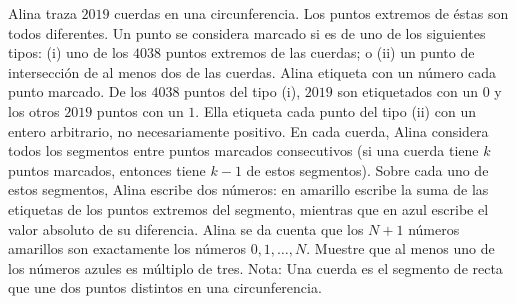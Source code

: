 Alina traza $2019$ cuerdas en una circunferencia. Los puntos extremos de éstas son
todos diferentes. Un punto se considera marcado si es de uno de los siguientes tipos:
(i) uno de los $4038$ puntos extremos de las cuerdas; o
(ii) un punto de intersección de al menos dos de las cuerdas.
Alina etiqueta con un número cada punto marcado. De los $4038$ puntos del tipo (i), $2019$ son etiquetados con un $0$ y los otros $2019$ puntos con un $1$. Ella etiqueta cada punto del tipo (ii) con un entero
arbitrario, no necesariamente positivo.
En cada cuerda, Alina considera todos los segmentos entre puntos marcados consecutivos (si una
cuerda tiene $k$ puntos marcados, entonces tiene $k − 1$ de estos segmentos). Sobre cada uno de estos
segmentos, Alina escribe dos números: en amarillo escribe la suma de las etiquetas de los puntos
extremos del segmento, mientras que en azul escribe el valor absoluto de su diferencia.
Alina se da cuenta que los $N + 1$ números amarillos son exactamente los números $0, 1,\dots , N$.
Muestre que al menos uno de los números azules es múltiplo de tres.
Nota: Una cuerda es el segmento de recta que une dos puntos distintos en una circunferencia.